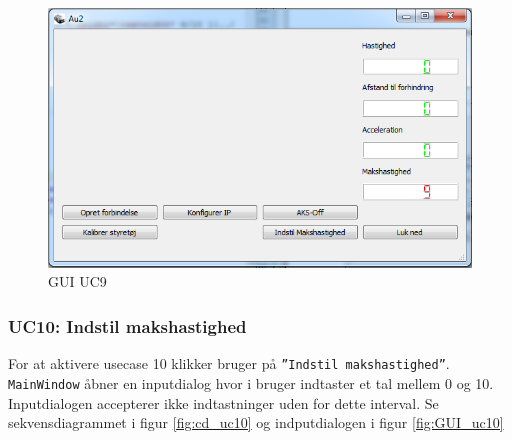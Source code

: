 \begin{figure}[H]
\centering
\includegraphics[width=\textwidth* 3/4,height=\textwidth* 9/20 ]{../fig/billeder/gui_uc9.png}
\caption{GUI UC9}
\label{fig:GUI_uc9}
\end{figure}

\clearpage

\subsubsection{UC10: Indstil makshastighed}
For at aktivere usecase 10 klikker bruger på \texttt{''Indstil makshastighed''}.
\texttt{MainWindow} åbner en inputdialog hvor i bruger indtaster et tal mellem 0 og 10. Inputdialogen accepterer ikke indtastninger uden for dette interval. Se sekvensdiagrammet i figur \ref{fig:cd_uc10} og indputdialogen i figur \ref{fig:GUI_uc10}


